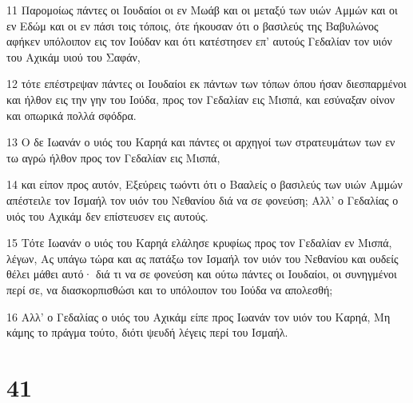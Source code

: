 \par 11 Παρομοίως πάντες οι Ιουδαίοι οι εν Μωάβ και οι μεταξύ των υιών Αμμών και οι εν Εδώμ και οι εν πάσι τοις τόποις, ότε ήκουσαν ότι ο βασιλεύς της Βαβυλώνος αφήκεν υπόλοιπον εις τον Ιούδαν και ότι κατέστησεν επ' αυτούς Γεδαλίαν τον υιόν του Αχικάμ υιού του Σαφάν,
\par 12 τότε επέστρεψαν πάντες οι Ιουδαίοι εκ πάντων των τόπων όπου ήσαν διεσπαρμένοι και ήλθον εις την γην του Ιούδα, προς τον Γεδαλίαν εις Μισπά, και εσύναξαν οίνον και οπωρικά πολλά σφόδρα.
\par 13 Ο δε Ιωανάν ο υιός του Καρηά και πάντες οι αρχηγοί των στρατευμάτων των εν τω αγρώ ήλθον προς τον Γεδαλίαν εις Μισπά,
\par 14 και είπον προς αυτόν, Εξεύρεις τωόντι ότι ο Βααλείς ο βασιλεύς των υιών Αμμών απέστειλε τον Ισμαήλ τον υιόν του Νεθανίου διά να σε φονεύση; Αλλ' ο Γεδαλίας ο υιός του Αχικάμ δεν επίστευσεν εις αυτούς.
\par 15 Τότε Ιωανάν ο υιός του Καρηά ελάλησε κρυφίως προς τον Γεδαλίαν εν Μισπά, λέγων, Ας υπάγω τώρα και ας πατάξω τον Ισμαήλ τον υιόν του Νεθανίου και ουδείς θέλει μάθει αυτό· διά τι να σε φονεύση και ούτω πάντες οι Ιουδαίοι, οι συνηγμένοι περί σε, να διασκορπισθώσι και το υπόλοιπον του Ιούδα να απολεσθή;
\par 16 Αλλ' ο Γεδαλίας ο υιός του Αχικάμ είπε προς Ιωανάν τον υιόν του Καρηά, Μη κάμης το πράγμα τούτο, διότι ψευδή λέγεις περί του Ισμαήλ.

\chapter{41}

